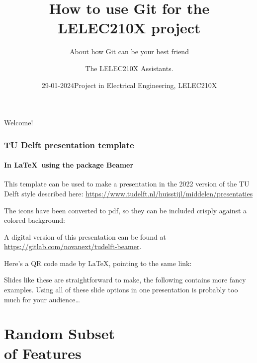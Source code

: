 \documentclass[t, aspectratio=169, english, table]{_style/tudelft-beamer}
\title[Git Tutorial]{How to use Git for the LELEC210X project}
\subtitle{About how Git can be your best friend}
\author[Assistants Team\inst{1}]{The LELEC210X Assistants\inst{1}.}
\date{29-01-2024}
\institute[Universities of Somewhere and Elsewhere]{
  \strut\llap{\inst{1}\,}UCLouvain}
\date[LELEC210X]{Project in Electrical Engineering, LELEC210X}
\begin{document}
\titleframe


\begin{frame}[fragile]{Welcome!} %
  \frametitle{TU Delft presentation template}
  \framesubtitle{In \LaTeX\ using the package Beamer}
  
  This template can be used to make a presentation in the 2022 version of the TU Delft style described here:
  \url{https://www.tudelft.nl/huisstijl/middelen/presentaties}
  
  The icons have been converted to pdf, so they can be included crisply against a colored background:
  
\end{frame}


\begin{frame}
  A digital version of this presentation can be found at \url{https://gitlab.com/novanext/tudelft-beamer}.

  Here's a QR code made by \LaTeX, pointing to the same link:

  \begin{center}  
  \end{center}

  Slides like these are straightforward to make, the following contains more fancy examples. Using all of these slide options in one presentation is probably too much for your audience\ldots
\end{frame}


{
  \renewcommand{\bginsert}{\hfill\raisebox{0.45\paperheight}{\color{tud purple}%
    \clap{\texttt{[image: uclouvain-logo.pdf]}}}\hfill}
  \renewcommand{\sectionsubtitle}{Hope you will be inspired!}
  \section{Random Subset\\of Features}
}
\end{document}
